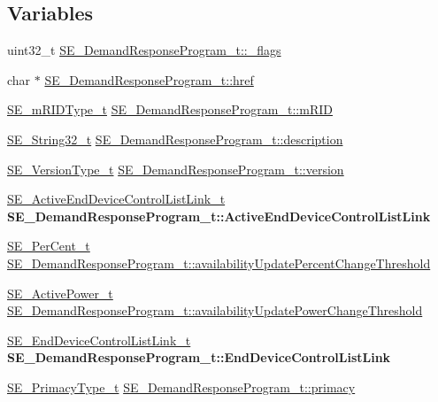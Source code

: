 \subsection*{Variables}
\begin{DoxyCompactItemize}
\item 
uint32\+\_\+t \hyperlink{group__DemandResponseProgram_gabee537c682dee0fedf7998b5d1d7c40a}{S\+E\+\_\+\+Demand\+Response\+Program\+\_\+t\+::\+\_\+flags}
\item 
char $\ast$ \hyperlink{group__DemandResponseProgram_gabe6a9ae9d11c40abf1de49df60c33fb2}{S\+E\+\_\+\+Demand\+Response\+Program\+\_\+t\+::href}
\item 
\hyperlink{group__mRIDType_gac74622112f3a388a2851b2289963ba5e}{S\+E\+\_\+m\+R\+I\+D\+Type\+\_\+t} \hyperlink{group__DemandResponseProgram_ga3a7dd308a30495cb98c203c6ae3074d1}{S\+E\+\_\+\+Demand\+Response\+Program\+\_\+t\+::m\+R\+ID}
\item 
\hyperlink{group__String32_gac9f59b06b168b4d2e0d45ed41699af42}{S\+E\+\_\+\+String32\+\_\+t} \hyperlink{group__DemandResponseProgram_ga5ba27e88d6bbc2941240c7ed18ab91c7}{S\+E\+\_\+\+Demand\+Response\+Program\+\_\+t\+::description}
\item 
\hyperlink{group__VersionType_ga4b8d27838226948397ed99f67d46e2ae}{S\+E\+\_\+\+Version\+Type\+\_\+t} \hyperlink{group__DemandResponseProgram_ga1e8b20fd85c49cfe1c51cf8e23f882b5}{S\+E\+\_\+\+Demand\+Response\+Program\+\_\+t\+::version}
\item 
\mbox{\label{group__DemandResponseProgram_ga81a783ce95dfdd5fe1451d9aaa59be37}} 
\hyperlink{structSE__ActiveEndDeviceControlListLink__t}{S\+E\+\_\+\+Active\+End\+Device\+Control\+List\+Link\+\_\+t} {\bfseries S\+E\+\_\+\+Demand\+Response\+Program\+\_\+t\+::\+Active\+End\+Device\+Control\+List\+Link}
\item 
\hyperlink{group__PerCent_ga14278cbee754c63496035b722b417ddc}{S\+E\+\_\+\+Per\+Cent\+\_\+t} \hyperlink{group__DemandResponseProgram_ga6eb5a29af00dc76559cac834c13483e7}{S\+E\+\_\+\+Demand\+Response\+Program\+\_\+t\+::availability\+Update\+Percent\+Change\+Threshold}
\item 
\hyperlink{structSE__ActivePower__t}{S\+E\+\_\+\+Active\+Power\+\_\+t} \hyperlink{group__DemandResponseProgram_gaa9a70f7f15f23119e07dc018038b5fd4}{S\+E\+\_\+\+Demand\+Response\+Program\+\_\+t\+::availability\+Update\+Power\+Change\+Threshold}
\item 
\mbox{\label{group__DemandResponseProgram_ga74d041154165d23e9da4f5b68ca1eb76}} 
\hyperlink{structSE__EndDeviceControlListLink__t}{S\+E\+\_\+\+End\+Device\+Control\+List\+Link\+\_\+t} {\bfseries S\+E\+\_\+\+Demand\+Response\+Program\+\_\+t\+::\+End\+Device\+Control\+List\+Link}
\item 
\hyperlink{group__PrimacyType_ga484b22ef8ff92c8801e6a8b7bd8351eb}{S\+E\+\_\+\+Primacy\+Type\+\_\+t} \hyperlink{group__DemandResponseProgram_ga40432a268b74349a00a8d08ed9710519}{S\+E\+\_\+\+Demand\+Response\+Program\+\_\+t\+::primacy}
\end{DoxyCompactItemize}


